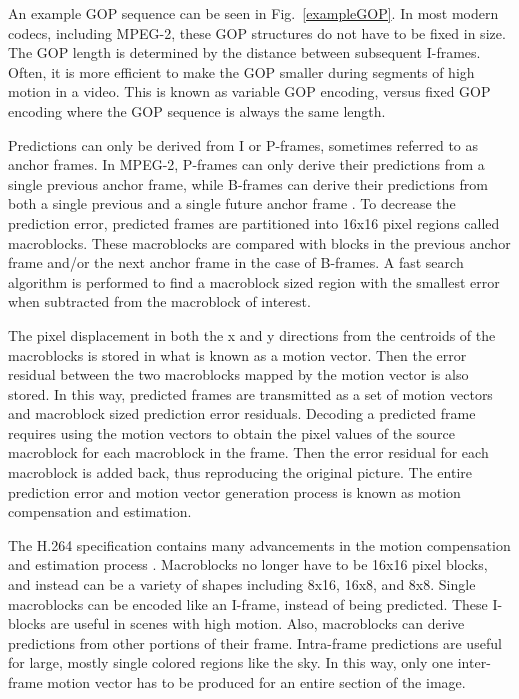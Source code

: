 An example GOP sequence can be seen in Fig.~\ref{exampleGOP}. In most modern codecs, including MPEG-2, these GOP structures do not have to be fixed in size. The GOP length is determined by the distance between subsequent I-frames. Often, it is more efficient to make the GOP smaller during segments of high motion in a video. This is known as variable GOP encoding, versus fixed GOP encoding where the GOP sequence is always the same length.

Predictions can only be derived from I or P-frames, sometimes referred to as anchor frames. In MPEG-2, P-frames can only derive their predictions from a single previous anchor frame, while B-frames can derive their predictions from both a single previous and a single future anchor frame \cite{mpeg2}. To decrease the prediction error, predicted frames are partitioned into 16x16 pixel regions called macroblocks. These macroblocks are compared with blocks in the previous anchor frame and/or the next anchor frame in the case of B-frames. A fast search algorithm is performed to find a macroblock sized region with the smallest error when subtracted from the macroblock of interest.

The pixel displacement in both the x and y directions from the centroids of the macroblocks is stored in what is known as a motion vector. Then the error residual between the two macroblocks mapped by the motion vector is also stored. In this way, predicted frames are transmitted as a set of motion vectors and macroblock sized prediction error residuals. Decoding a predicted frame requires using the motion vectors to obtain the pixel values of the source macroblock for each macroblock in the frame. Then the error residual for each macroblock is added back, thus reproducing the original picture. The entire prediction error and motion vector generation process is known as motion compensation and estimation.

The H.264 specification contains many advancements in the motion compensation and estimation process \cite{h264} \cite{h264Overview}. Macroblocks no longer have to be 16x16 pixel blocks, and instead can be a variety of shapes including 8x16, 16x8, and 8x8. Single macroblocks can be encoded like an I-frame, instead of being predicted. These I-blocks are useful in scenes with high motion. Also, macroblocks can derive predictions from other portions of their frame. Intra-frame predictions are useful for large, mostly single colored regions like the sky. In this way, only one inter-frame motion vector has to be produced for an entire section of the image. 

